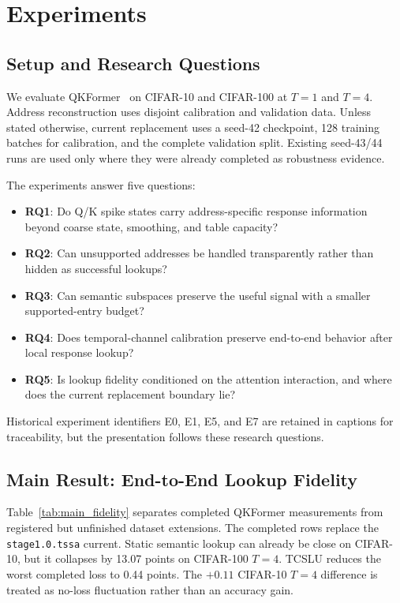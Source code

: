 \section{Experiments}
\label{sec:experiments}

\subsection{Setup and Research Questions}
\label{sec:setup}

We evaluate QKFormer~\cite{zhou2024qkformer} on CIFAR-10 and CIFAR-100 at
$T=1$ and $T=4$. Address reconstruction uses disjoint calibration and
validation data. Unless stated otherwise, current replacement uses a seed-42
checkpoint, 128 training batches for calibration, and the complete validation
split. Existing seed-43/44 runs are used only where they were already completed
as robustness evidence.

The experiments answer five questions:
\begin{itemize}
  \item \textbf{RQ1}: Do Q/K spike states carry address-specific response
  information beyond coarse state, smoothing, and table capacity?
  \item \textbf{RQ2}: Can unsupported addresses be handled transparently
  rather than hidden as successful lookups?
  \item \textbf{RQ3}: Can semantic subspaces preserve the useful signal with a
  smaller supported-entry budget?
  \item \textbf{RQ4}: Does temporal-channel calibration preserve end-to-end
  behavior after local response lookup?
  \item \textbf{RQ5}: Is lookup fidelity conditioned on the attention
  interaction, and where does the current replacement boundary lie?
\end{itemize}
Historical experiment identifiers E0, E1, E5, and E7 are retained in captions
for traceability, but the presentation follows these research questions.

\subsection{Main Result: End-to-End Lookup Fidelity}
\label{sec:main_fidelity}

Table~\ref{tab:main_fidelity} separates completed QKFormer measurements from
registered but unfinished dataset extensions. The completed rows replace the
\texttt{stage1.0.tssa} current. Static semantic lookup can already be close on
CIFAR-10, but it collapses by 13.07 points on CIFAR-100 $T=4$. TCSLU reduces
the worst completed loss to 0.44 points. The $+0.11$ CIFAR-10 $T=4$
difference is treated as no-loss fluctuation rather than an accuracy gain.

